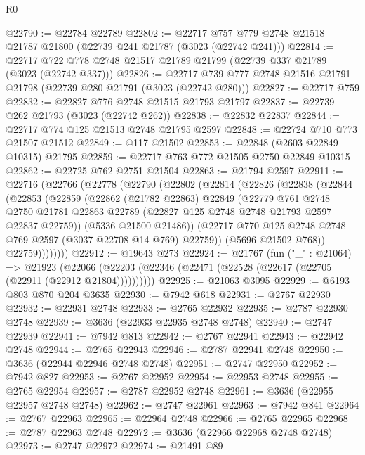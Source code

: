 \begin{lexlean}{R0}
\begin{coremodule}
@22790 := @22784 @22789
@22802 := @22717 @757 @779 @2748 @21518 @21787 @21800 (@22739 @241 @21787 (@3023 (@22742 @241)))
@22814 := @22717 @722 @778 @2748 @21517 @21789 @21799 (@22739 @337 @21789 (@3023 (@22742 @337)))
@22826 := @22717 @739 @777 @2748 @21516 @21791 @21798 (@22739 @280 @21791 (@3023 (@22742 @280)))
@22827 := @22717 @759
@22832 := @22827 @776 @2748 @21515 @21793 @21797
@22837 := @22739 @262 @21793 (@3023 (@22742 @262))
@22838 := @22832 @22837
@22844 := @22717 @774 @125 @21513 @2748 @21795 @2597
@22848 := @22724 @710 @773 @21507 @21512
@22849 := @117 @21502
@22853 := @22848 (@2603 @22849 @10315) @21795
@22859 := @22717 @763 @772 @21505 @2750 @22849 @10315
@22862 := @22725 @762 @2751 @21504
@22863 := @21794 @2597
@22911 := @22716
    (@22766
      (@22778
        (@22790
          (@22802
            (@22814
              (@22826
                (@22838
                  (@22844
                    (@22853
                      (@22859
                        (@22862
                          (@21782 @22863)
                          @22849
                          (@22779
                            @761
                            @2748
                            @2750
                            @21781
                            @22863
                            @22789
                            (@22827 @125 @2748 @2748 @21793 @2597 @22837 @22759))
                          (@5336 @21500 @21486))
                        (@22717 @770 @125 @2748 @2748 @769 @2597 (@3037 @22708 @14 @769) @22759))
                      (@5696 @21502 @768))
                    @22759))))))))
@22912 := @19643 @273
@22924 := @21767
    (fun ("_" : @21064) =>
    @21923 (@22066 (@22203 (@22346 (@22471 (@22528 (@22617 (@22705 (@22911 (@22912 @21804))))))))))
@22925 := @21063 @3095
@22929 := @6193 @803 @870 @204 @3635
@22930 := @7942 @618
@22931 := @2767 @22930
@22932 := @22931 @2748
@22933 := @2765 @22932
@22935 := @2787 @22930 @2748
@22939 := @3636 (@22933 @22935 @2748 @2748)
@22940 := @2747 @22939
@22941 := @7942 @813
@22942 := @2767 @22941
@22943 := @22942 @2748
@22944 := @2765 @22943
@22946 := @2787 @22941 @2748
@22950 := @3636 (@22944 @22946 @2748 @2748)
@22951 := @2747 @22950
@22952 := @7942 @827
@22953 := @2767 @22952
@22954 := @22953 @2748
@22955 := @2765 @22954
@22957 := @2787 @22952 @2748
@22961 := @3636 (@22955 @22957 @2748 @2748)
@22962 := @2747 @22961
@22963 := @7942 @841
@22964 := @2767 @22963
@22965 := @22964 @2748
@22966 := @2765 @22965
@22968 := @2787 @22963 @2748
@22972 := @3636 (@22966 @22968 @2748 @2748)
@22973 := @2747 @22972
@22974 := @21491 @89

\end{coremodule}
\end{lexlean}
